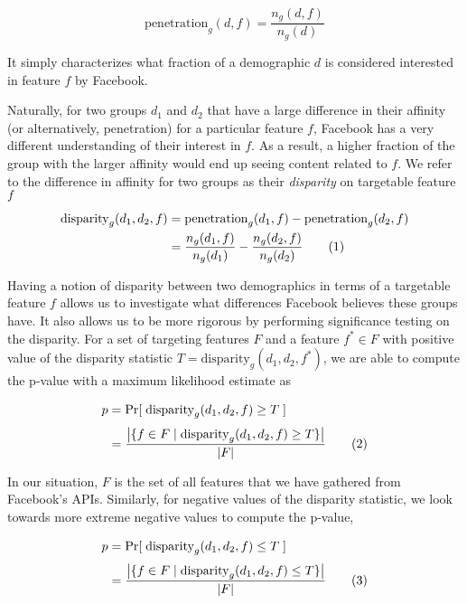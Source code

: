 \begin{equation}
\text{penetration}_g(d, f) = \frac{n_g(d, f)}{n_g(d)}
\label{eq:pen}
\end{equation}

It simply characterizes what fraction of a demographic $d$ is considered interested in feature $f$ by Facebook.

Naturally, for two groups $d_1$ and $d_2$ that have a large difference in their affinity (or alternatively, penetration) for a particular feature $f$, Facebook has a very different understanding of their interest in $f$. As a result, a higher fraction of the group with the larger affinity would end up seeing content related to $f$. We refer to the difference in affinity for two groups as their \textit{disparity} on targetable feature $f$

\begin{align*}
\text{disparity}_g(d_1, d_2, f) &= \text{penetration}_g(d_1, f) - \text{penetration}_g(d_2, f)\\
&= \frac{n_g(d_1, f)}{n_g(d_1)} - \frac{n_g(d_2, f)}{n_g(d_2)} \addtocounter{equation}{1}\tag{\theequation}
\label{eq:disparity}
\end{align*}

Having a notion of disparity between two demographics in terms of a targetable feature $f$ allows us to investigate what differences Facebook believes these groups have. It also allows us to be more rigorous by performing significance testing on the disparity. For a set of targeting features $F$ and a feature $f^* \in F$ with positive value of the disparity statistic $T = \text{disparity}_g(d_1, d_2, f^*)$, we are able to compute the p-value with a maximum likelihood estimate as

\begin{align*}
p &= \Pr[\; \text{disparity}_g(d_1, d_2, f) \geq T \;]\\[.3em]
&= \frac{\big|\{f \in F \; | \; \text{disparity}_g(d_1, d_2, f) \geq T\}\big|}{|F|} \addtocounter{equation}{1}\tag{\theequation}
\label{eq:p_val_positive}
\end{align*}

In our situation, $F$ is the set of all features that we have gathered from Facebook's APIs. Similarly, for negative values of the disparity statistic, we look towards more extreme negative values to compute the p-value,

\begin{align*}
p &= \Pr[\; \text{disparity}_g(d_1, d_2, f) \leq T \;]\\[.3em]
&= \frac{\big|\{f \in F \; | \; \text{disparity}_g(d_1, d_2, f) \leq T\}\big|}{|F|} \addtocounter{equation}{1}\tag{\theequation}
\label{eq:p_val_negative}
\end{align*}

